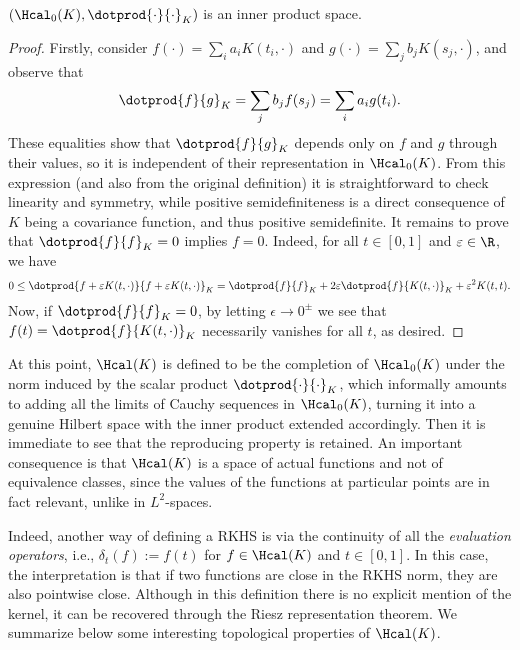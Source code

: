 \begin{proposition} \((\Hcal_0(K), \dotprod{\cdot}{\cdot}_K)\) is an inner product space.
\end{proposition}
  \begin{proof}
    Firstly, consider \(f(\cdot)=\sum_i a_i K(t_i, \cdot) \) and \(g(\cdot)=\sum_j b_j K(s_j, \cdot)\), and observe that
    \[
      \dotprod{f}{g}_K = \sum_j b_j f(s_j) = \sum_i a_i g(t_i).
    \]
    These equalities show that \(\dotprod{f}{g}_K\) depends only on \(f\) and \(g\) through their values, so it is independent of their representation in \(\Hcal_0(K)\). From this expression (and also from the original definition) it is straightforward to check linearity and symmetry, while positive semidefiniteness is a direct consequence of \(K\) being a covariance function, and thus positive semidefinite. It remains to prove that \(\dotprod{f}{f}_K=0\) implies \(f=0\). Indeed, for all \(t\in[0,1]\) and \(\epsilon \in \R\), we have
    \[
    0 \leq \dotprod{f + \epsilon K(t, \cdot)}{f + \epsilon K(t, \cdot)}_K = \dotprod{f}{f}_K + 2\epsilon\dotprod{f}{K(t, \cdot)}_K + \epsilon^2 K(t, t).
    \]
    Now, if \(\dotprod{f}{f}_K=0\), by letting \(\epsilon\to 0^{\pm}\) we see that \(f(t)=\dotprod{f}{K(t, \cdot)}_K\) necessarily vanishes for all \(t\), as desired.
  \end{proof}

At this point, \(\Hcal(K)\) is defined to be the completion of \(\Hcal_0(K)\) under the norm induced by the scalar product \(\dotprod{\cdot}{\cdot}_K\), which informally amounts to adding all the limits of Cauchy sequences in \(\Hcal_0(K)\), turning it into a genuine Hilbert space with the inner product extended accordingly. Then it is immediate to see that the reproducing property is retained. An important consequence is that \(\Hcal(K)\) is a space of actual functions and not of equivalence classes, since the values of the functions at particular points are in fact relevant, unlike in \(L^2\)-spaces.

Indeed, another way of defining a RKHS is via the continuity of all the \textit{evaluation operators}, i.e., \(\delta_t(f) := f(t)\) for \(f\in\Hcal(K)\) and \(t\in[0,1]\). In this case, the interpretation is that if two functions are close in the RKHS norm, they are also pointwise close. Although in this definition there is no explicit mention of the kernel, it can be recovered through the Riesz representation theorem. We summarize below some interesting topological properties of \(\Hcal(K)\).

